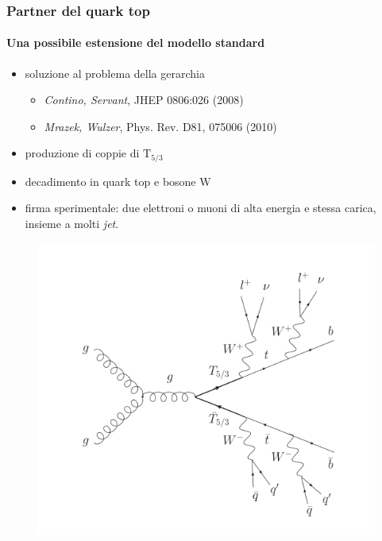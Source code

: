 \documentclass[italian]{beamer}
\begin{document}
\begin{frame}
    \frametitle{Partner del quark top}
    \framesubtitle{Una possibile estensione del modello standard}
    \begin{itemize}
        \item soluzione al problema della gerarchia
            \begin{itemize}
                \item \emph{Contino, Servant}, JHEP 0806:026 (2008)
                \item \emph{Mrazek, Wulzer}, Phys. Rev. D81, 075006 (2010)
            \end{itemize}
        \item produzione di coppie di $\mathrm{T}_{5/3}$
        \item decadimento in quark top e bosone $\mathrm{W}$
        \item \alert{firma sperimentale: due elettroni o muoni di alta energia e
                stessa carica, insieme a molti \emph{jet}.}
    \end{itemize}
    \begin{figure}[h]
        \centering
        \includegraphics[height=.5\textheight]{TTbar_feynman}
    \end{figure}
\end{frame}
\end{document}
